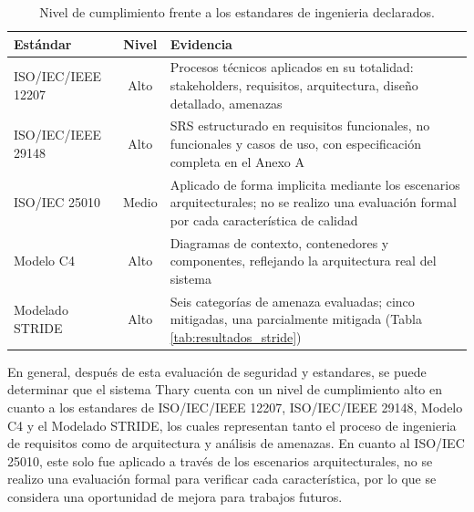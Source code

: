 \begin{table}[H]
    \centering
    \caption{Nivel de cumplimiento frente a los estandares de ingenieria declarados.}
    \label{tab:cumplimiento_estandares}
    \renewcommand{\arraystretch}{1.3}
    \begin{tabularx}{\textwidth}{|l|c|X|}
    \hline
    \textbf{Estándar} & \textbf{Nivel} & \textbf{Evidencia} \\
    \hline
    ISO/IEC/IEEE 12207 & Alto & Procesos técnicos aplicados en su totalidad: stakeholders, requisitos, arquitectura, diseño detallado, amenazas \\
    \hline
    ISO/IEC/IEEE 29148 & Alto & SRS estructurado en requisitos funcionales, no funcionales y casos de uso, con especificación completa en el Anexo A \\
    \hline
    ISO/IEC 25010 & Medio & Aplicado de forma implicita mediante los escenarios arquitecturales; no se realizo una evaluación formal por cada característica de calidad \\
    \hline
    Modelo C4 & Alto & Diagramas de contexto, contenedores y componentes, reflejando la arquitectura real del sistema \\
    \hline
    Modelado STRIDE & Alto & Seis categorías de amenaza evaluadas; cinco mitigadas, una parcialmente mitigada (Tabla \ref{tab:resultados_stride}) \\
    \hline
    \end{tabularx}
\end{table}

En general, después de esta evaluación de seguridad y estandares, se puede determinar que el sistema Thary cuenta con un nivel de cumplimiento alto en cuanto a los estandares de ISO/IEC/IEEE 12207, ISO/IEC/IEEE 29148, Modelo C4 y el Modelado STRIDE, los cuales representan tanto el proceso de ingenieria de requisitos como de arquitectura y análisis de amenazas. En cuanto al ISO/IEC 25010, este solo fue aplicado a través de los escenarios arquitecturales, no se realizo una evaluación formal para verificar cada característica, por lo que se considera una oportunidad de mejora para trabajos futuros. 